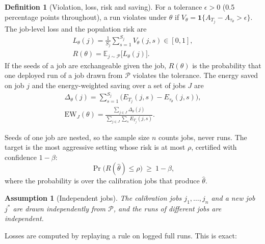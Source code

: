 \documentclass[3p,twocolumn,10pt]{elsarticle}
\newtheorem{assumption}{Assumption}
\theoremstyle{definition}
\newtheorem{definition}{Definition}
\begin{document}
\begin{definition}[Violation, loss, risk and saving]
\label{def:loss}
For a tolerance $\epsilon>0$ (0.5 percentage points throughout), a run violates under $\theta$ if
$V_\theta=\mathbf{1}\{A_{T_j}-A_{\tau_\theta}>\epsilon\}$. The job-level loss and the population risk are
\begin{equation}
\begin{gathered}
L_\theta(j)=\frac{1}{S_j}\sum_{s=1}^{S_j}V_\theta(j,s)\in[0,1],\\
R(\theta)=\mathbb{E}_{j\sim\mathcal{P}}\big[L_\theta(j)\big].
\end{gathered}
\label{eq:risk}
\end{equation}
If the seeds of a job are exchangeable given the job, $R(\theta)$ is the probability that one deployed run of a job drawn from $\mathcal{P}$ violates the tolerance. The energy saved on job $j$ and the energy-weighted saving over a set of jobs $J$ are
\begin{equation}
\begin{gathered}
\Delta_\theta(j)=\sum_{s=1}^{S_j}\big(E_{T_j}(j,s)-E_{\tau_\theta}(j,s)\big),\\
\mathrm{EW}_J(\theta)=\frac{\sum_{j\in J}\Delta_\theta(j)}{\sum_{j\in J}\sum_{s}E_{T_j}(j,s)}.
\end{gathered}
\label{eq:ew}
\end{equation}
\end{definition}

\noindent Seeds of one job are nested, so the sample size $n$ counts jobs, never runs. The target is the most aggressive setting whose risk is at most $\rho$, certified with confidence $1-\beta$:
\begin{equation}
\Pr\big(R(\hat\theta)\le\rho\big)\ \ge\ 1-\beta,
\label{eq:target}
\end{equation}
where the probability is over the calibration jobs that produce $\hat\theta$.

\begin{assumption}[Independent jobs]
\label{ass:iid}
The calibration jobs $j_1,\dots,j_n$ and a new job $j^\ast$ are drawn independently from $\mathcal{P}$, and the runs of different jobs are independent.
\end{assumption}

\noindent Losses are computed by replaying a rule on logged full runs. This is exact:
\end{document}
